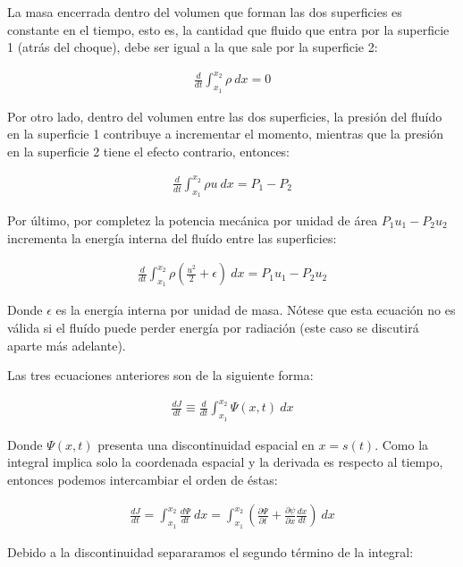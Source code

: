 La masa encerrada dentro del volumen que forman las dos superficies es constante en el tiempo, esto es, la cantidad que fluido que entra por la superficie 1 (atrás del choque), debe ser igual a la que sale por la superficie 2:

\begin{align}
  \frac{d}{dt}\int^{x_2}_{x_1} \rho~dx = 0 \label{eq:rho-dx}
\end{align}

Por otro lado, dentro del volumen entre las dos superficies, la presión del fluído en la superficie 1 contribuye a incrementar el momento, mientras que la presión en la superficie 2 tiene el efecto contrario, entonces:

\begin{align}
  \frac{d}{dt}\int^{x_2}_{x_1} \rho u~dx = P_1 - P_2 \label{eq:u-rho-dx}
\end{align}

Por último, por completez la potencia mecánica por unidad de área $P_1u_1 - P_2u_2$ incrementa la energía interna del fluído entre las superficies:

\begin{align}
  \frac{d}{dt}\int^{x_2}_{x_1} \rho\left(\frac{u^2}{2} + \epsilon\right)~dx = P_1u_1 - P_2u_2 \label{eq:rho-u2-epsilon-dx}
\end{align}

Donde $\epsilon$ es la energía interna por unidad de masa. Nótese que esta ecuación no es válida si el fluído puede perder energía por radiación (este caso se discutirá aparte más adelante).

Las tres ecuaciones anteriores son de la siguiente forma:

\begin{align}
  \frac{dJ}{dt} \equiv \frac{d}{dt}\int^{x_2}_{x_1} \Psi(x, t)~dx
\end{align}

Donde $\Psi(x, t)$ presenta una discontinuidad espacial en $x=s(t)$. Como la integral implica solo la coordenada espacial y la derivada es respecto al tiempo, entonces podemos intercambiar el orden de éstas:

\begin{align}
    \frac{dJ}{dt} = \int^{x_2}_{x_1} \frac{d\Psi}{dt}~dx = \int^{x_2}_{x_1} \left(\frac{\partial\Psi}{\partial t} + \frac{\partial\psi}{\partial x}\frac{dx}{dt}\right)~dx
\end{align}

Debido a la discontinuidad separaramos el segundo término de la integral:

